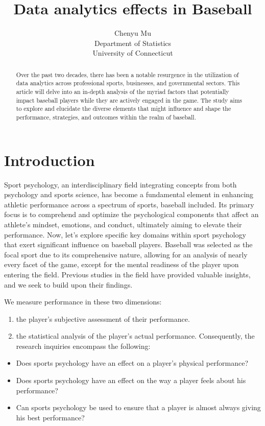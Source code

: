 \documentclass[12pt]{article}
\title{Data analytics effects in Baseball}
\author{Chenyu Mu\\
  Department of Statistics\\
  University of Connecticut
}
\begin{document}
\maketitle

\begin{abstract}
  Over the past two decades, there has been a notable resurgence in the utilization of data analytics across professional sports, businesses, and governmental sectors.
  This article will delve into an in-depth analysis of the myriad factors that potentially impact baseball players while they are actively engaged in the game. 
  The study aims to explore and elucidate the diverse elements that might influence and shape the performance, strategies, and outcomes within the realm of baseball. 
  \end{abstract}


\section{Introduction}
\label{sec:intro}
Sport psychology, an interdisciplinary field integrating concepts from both psychology and sports science, has become a fundamental element in enhancing athletic performance across a spectrum of sports, baseball included.
Its primary focus is to comprehend and optimize the psychological components that affect an athlete's mindset, emotions, and conduct, ultimately aiming to elevate their performance.
Now, let's explore specific key domains within sport psychology that exert significant influence on baseball players.
Baseball was selected as the focal sport due to its comprehensive nature, allowing for an analysis of nearly every facet of the game, except for the mental readiness of the player upon entering the field. 
Previous studies in the field \cite{Dalmass2018baseball} have provided valuable insights, and we seek to build upon their findings. 

We measure performance in these two dimensions: 
\begin{enumerate}
\item the player's subjective assessment of their performance. 
\item the statistical analysis of the player's actual performance. Consequently, the research inquiries encompass the following:
\end{enumerate}
\begin{itemize}
  \item Does sports psychology have an effect on a player's physical performance?
  \item Does sports psychology have an effect on the way a player feels about his performance?
  \item Can sports psychology be used to ensure that a player is almost always giving his best performance?
\end{itemize}
\end{document}
